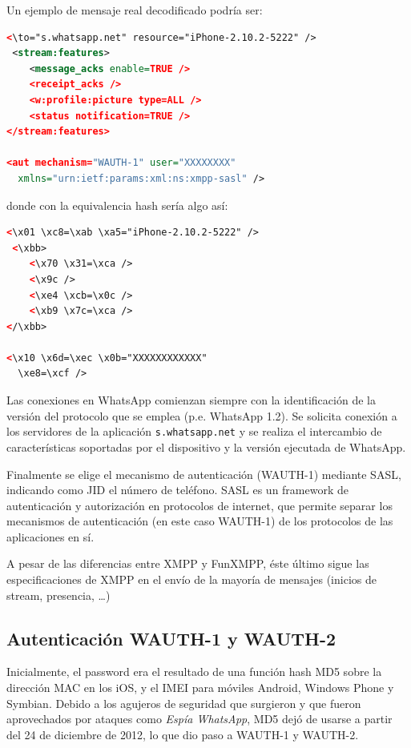 \documentclass[a4paper, 11pt]{article} %
\begin{document}
  Un ejemplo de mensaje real decodificado podría ser:

\begin{lstlisting}[language=XML] 
 <\to="s.whatsapp.net" resource="iPhone-2.10.2-5222" />
 <stream:features>
    <message_acks enable=TRUE />
    <receipt_acks />
    <w:profile:picture type=ALL />
    <status notification=TRUE />
</stream:features>

<aut mechanism="WAUTH-1" user="XXXXXXXX"
  xmlns="urn:ietf:params:xml:ns:xmpp-sasl" />
\end{lstlisting}

  donde con la equivalencia hash sería algo así:

\begin{lstlisting}[language=XML] 
 <\x01 \xc8=\xab \xa5="iPhone-2.10.2-5222" />
 <\xbb>
    <\x70 \x31=\xca />
    <\x9c />
    <\xe4 \xcb=\x0c />
    <\xb9 \x7c=\xca />
</\xbb>

<\x10 \x6d=\xec \x0b="XXXXXXXXXXXX"
  \xe8=\xcf />
\end{lstlisting}

  Las conexiones en WhatsApp comienzan siempre con la identificación de la versión del protocolo que se emplea (p.e. 
  WhatsApp 1.2). Se solicita conexión a los servidores de la aplicación \texttt{s.whatsapp.net} y se realiza el intercambio
  de características soportadas por el dispositivo y la versión ejecutada de WhatsApp.

  Finalmente se elige el mecanismo de autenticación (WAUTH-1) mediante SASL, indicando como JID el número de teléfono.
  SASL es un framework de autenticación y autorización en protocolos de internet, que permite separar los mecanismos de
  autenticación (en este caso WAUTH-1) de los protocolos de las aplicaciones en sí.

  A pesar de las diferencias entre XMPP y FunXMPP, éste último sigue las especificaciones de XMPP en el envío de la
  mayoría de mensajes (inicios de stream, presencia, \ldots)

  \subsection{Autenticación WAUTH-1 y WAUTH-2}
    Inicialmente, el password era el resultado de una función hash MD5 sobre la dirección MAC en los iOS, y el IMEI para
    móviles Android, Windows Phone y Symbian.
    Debido a los agujeros de seguridad que surgieron y que fueron aprovechados por ataques como \textit{Espía WhatsApp}, %
    MD5 dejó de usarse a partir del 24 de diciembre de 2012, lo que dio paso a WAUTH-1 y WAUTH-2.
\end{document}
